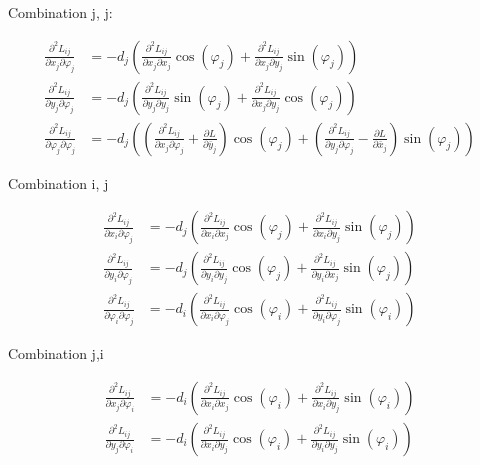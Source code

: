Combination j, j:

\begin{align}
\frac{\partial^2 L_{ij}}{\partial x_{j} \partial \varphi_{j}} &= -d_{j}\left( \frac{\partial^2 L_{ij}}{\partial x_{j} \partial x_{j}}\cos(\varphi_{j}) + \frac{\partial^2 L_{ij}}{\partial x_{j} \partial y_{j}}\sin(\varphi_{j})\right) \\
\frac{\partial^2 L_{ij}}{\partial y_{j} \partial \varphi_{j}} &= -d_{j}\left( \frac{\partial^2 L_{ij}}{\partial y_{j} \partial y_{j}}\sin(\varphi_{j}) + \frac{\partial^2 L_{ij}}{\partial x_{j} \partial y_{j}}\cos(\varphi_{j})\right) \\
\frac{\partial^2 L_{ij}}{\partial \varphi_{j} \partial \varphi_{j}} &= -d_{j}\left(\left(\frac{\partial^2 L_{ij}}{\partial x_{j} \partial \varphi_{j}} + \frac{\partial L}{\partial \bar{y}_{j}}\right)\cos(\varphi_{j}) + \left(\frac{\partial^2 L_{ij}}{\partial y_{j} \partial \varphi_{j}} - \frac{\partial L}{\partial \bar{x}_{j}}\right)\sin(\varphi_{j})\right)
\end{align}

Combination i, j

\begin{align}
\frac{\partial^2 L_{ij}}{\partial x_{i} \partial \varphi_{j}} &= -d_{j}\left( \frac{\partial^2 L_{ij}}{\partial x_{i} \partial x_{j}}\cos(\varphi_{j}) + \frac{\partial^2 L_{ij}}{\partial x_{i} \partial y_{j}}\sin(\varphi_{j})\right) \\
\frac{\partial^2 L_{ij}}{\partial y_{i} \partial \varphi_{j}} &= -d_{j}\left( \frac{\partial^2 L_{ij}}{\partial y_{i} \partial y_{j}}\cos(\varphi_{j}) + \frac{\partial^2 L_{ij}}{\partial y_{i} \partial x_{j}}\sin(\varphi_{j}) \right) \\
\frac{\partial^2 L_{ij}}{\partial \varphi_{i} \partial \varphi_{j}} &= -d_{i}\left( \frac{\partial^2 L_{ij}}{\partial x_{i} \partial \varphi_{j}}\cos(\varphi_{i}) + \frac{\partial^2 L_{ij}}{\partial y_{i} \partial \varphi_{j}}\sin(\varphi_{i})\right)
\end{align}

Combination j,i

\begin{align}
\frac{\partial^2 L_{ij}}{\partial x_{j} \partial \varphi_{i}} &= -d_{i}\left( \frac{\partial^2 L_{ij}}{\partial x_{i} \partial x_{j}}\cos(\varphi_{i}) + \frac{\partial^2 L_{ij}}{\partial x_{i} \partial y_{j}}\sin(\varphi_{i})\right) \\
\frac{\partial^2 L_{ij}}{\partial y_{j} \partial \varphi_{i}} &= -d_{i}\left( \frac{\partial^2 L_{ij}}{\partial x_{i} \partial y_{j}}\cos(\varphi_{i}) + \frac{\partial^2 L_{ij}}{\partial y_{i} \partial y_{j}}\sin(\varphi_{i}) \right)
\end{align}
